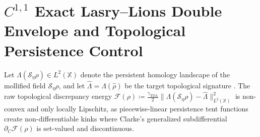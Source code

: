 \documentclass[11pt,a4paper,reqno]{article}
\theoremstyle{definition}
\theoremstyle{remark}
\begin{document}
\section{$C^{1,1}$ Exact Lasry--Lions Double Envelope and Topological Persistence Control}

Let $\Lambda(\mathcal{S}_\eta \rho) \in L^2(\mathbb{X})$ denote the persistent homology landscape of the mollified field $\mathcal{S}_\eta\rho$, and let $\hat{\Lambda} = \Lambda(\hat{\rho})$ be the target topological signature \cite{bubenik2015statistical, cohen2007stability}. The raw topological discrepancy energy $\mathcal{F}(\rho) \coloneqq \frac{\gamma_{\mathrm{TDA}}}{2} \|\Lambda(\mathcal{S}_\eta \rho) - \hat{\Lambda}\|_{L^2(\mathbb{X})}^2$ is non-convex and only locally Lipschitz, as piecewise-linear persistence tent functions create non-differentiable kinks where Clarke's generalized subdifferential $\partial_C\mathcal{F}(\rho)$ \cite{clarke1990optimization} is set-valued and discontinuous.
\end{document}
